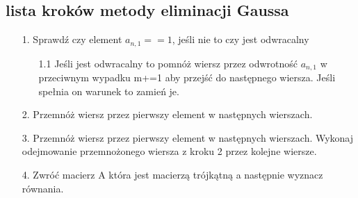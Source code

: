 \subsection{lista kroków metody eliminacji Gaussa} \label{Pseudokod Metody eliminacji Gaussa}
\begin{enumerate}
   \item[1.] Sprawdź czy element \begin{math}a_{n,1} == 1 \end{math}, jeśli nie to czy jest odwracalny
   \begin{enumerate}
       \item[1.1] Jeśli jest odwracalny to pomnóż wiersz przez odwrotność \begin{math}a_{n,1} \end{math} w przeciwnym wypadku  m+=1 aby przejść do następnego wiersza. Jeśli spełnia on warunek to zamień je.
    \end{enumerate}
    \item[2.] Przemnóż wiersz przez pierwszy element w następnych wierszach. 
    \item[3.] Przemnóż wiersz przez pierwszy element w następnych wierszach. Wykonaj odejmowanie przemnożonego wiersza z kroku 2 przez kolejne wiersze. 
    \item[4.] Zwróć macierz A która jest macierzą trójkątną a następnie wyznacz równania.
\end{enumerate}